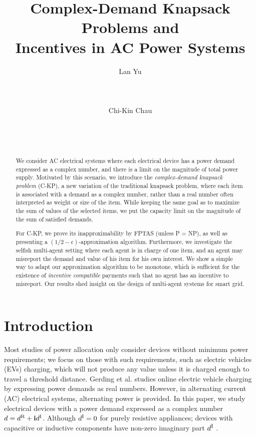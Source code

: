 \documentclass{aamas2013}
\title{Complex-Demand Knapsack Problems and \\Incentives in AC Power Systems}
\author{
\alignauthor
Lan Yu\\
			 \affaddr{Division of Mathematical Sciences}\\
			 \affaddr{School of Physical and Mathematical Sciences}\\
       \affaddr{Nanyang Technological University, Singapore}\\
       \email{yula0001@ntu.edu.sg}
\alignauthor Chi-Kin Chau\\
			 \affaddr{Computing and Information Science}\\
       \affaddr{Masdar Institute of Science and Technology}\\
       \affaddr{Abu Dhabi,UAE}\\
       \email{ckchau@masdar.ac.ae}
}
\begin{document}
\maketitle



\begin{abstract}
We consider AC electrical systems where each electrical device has a power demand expressed as a complex number, and there is a limit on the magnitude of total power supply.  Motivated by this scenario, we introduce the {\em complex-demand knapsack problem} ({\sc C-KP}), a new variation of the traditional knapsack problem, where each item is associated with a demand as a complex number, rather than a real number often interpreted as weight or size of the item.  While keeping the same goal as to maximize the sum of values of the selected items, we put the capacity limit on the magnitude of the sum of satisfied demands.

For {\sc C-KP}, we prove its inapproximability by FPTAS (unless P = NP), as well as presenting a $(1/2-\epsilon)$-approximation algorithm.  Furthermore, we investigate the selfish multi-agent setting where each agent is in charge of one item, and an agent may misreport the demand and value of his item for his own interest.  We show a simple way to adapt our approximation algorithm to be monotone, which is sufficient for the existence of {\em incentive compatible} payments such that no agent has an incentive to misreport.  Our results shed insight on the design of multi-agent systems for smart grid.
\end{abstract}




\section{Introduction}\label{sec:introduction}
\noindent
Most studies of power allocation only consider devices without minimum power requirements; we focus on those with such requirements, such as electric vehicles (EVs) charging, which will not produce any value unless it is charged enough to travel a threshold distance.  Gerding et al. \cite{gerding2011online} studies online electric vehicle charging by expressing power demands as real numbers.  However, in alternating current (AC) electrical systems, alternating power is provided.  In this paper, we study electrical devices with a power demand expressed as a complex number $d = d^{\rm R} + {\bf i} d^{\rm I}$.  Although $d^{\rm I}=0$ for purely resistive appliances; devices with capacitive or inductive components have non-zero imaginary part $d^{\rm I}$ \cite{GS94power}.  
\end{document}

